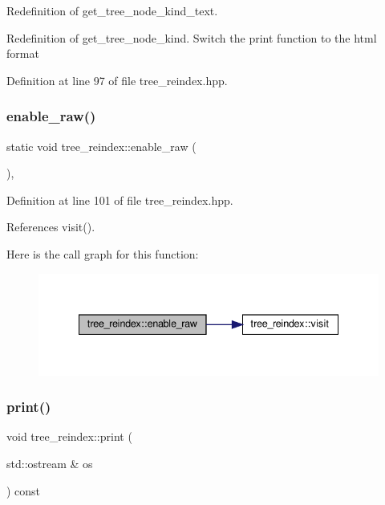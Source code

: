 Redefinition of get\+\_\+tree\+\_\+node\+\_\+kind\+\_\+text. 

Redefinition of get\+\_\+tree\+\_\+node\+\_\+kind. Switch the print function to the html format 

Definition at line 97 of file tree\+\_\+reindex.\+hpp.

\mbox{\label{classtree__reindex_a7f1a1a03af0e0163794ff438c1c4ba8c}} 
\subsubsection{\texorpdfstring{enable\+\_\+raw()}{enable\_raw()}}
{\footnotesize\ttfamily static void tree\+\_\+reindex\+::enable\+\_\+raw (\begin{DoxyParamCaption}{ }\end{DoxyParamCaption})\hspace{0.3cm}{\ttfamily [inline]}, {\ttfamily [static]}}



Definition at line 101 of file tree\+\_\+reindex.\+hpp.



References visit().

Here is the call graph for this function\+:
\nopagebreak
\begin{figure}[H]
\begin{center}
\leavevmode
\includegraphics[width=335pt]{dd/d99/classtree__reindex_a7f1a1a03af0e0163794ff438c1c4ba8c_cgraph}
\end{center}
\end{figure}
\mbox{\label{classtree__reindex_a5cbc2125a1f6e85c397b87d0d00507d9}} 
\subsubsection{\texorpdfstring{print()}{print()}}
{\footnotesize\ttfamily void tree\+\_\+reindex\+::print (\begin{DoxyParamCaption}\item[{std\+::ostream \&}]{os }\end{DoxyParamCaption}) const}



